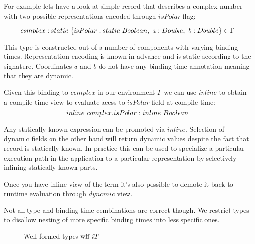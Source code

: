 For example lets have a look at simple record that describes a complex number with
two possible representations encoded through $isPolar$ flag:

\begin{equation}\nonumber
    complex: static\ \{ isPolar: static\ Boolean,\ a: Double,\ b: Double \} \in \Gamma
\end{equation}

This type is constructed out of a number of components with varying binding times.
Representation encoding is known in advance and is static according to the signature.
Coordinates $a$ and $b$ do not have any binding-time annotation meaning that they are
dynamic.

Given this binding to $complex$ in our environment $\Gamma$ we can use $inline$ to obtain
a compile-time view to evaluate acess to $isPolar$ field at compile-time:
\begin{equation}\nonumber
  inline\ complex.isPolar: inline\ Boolean
\end{equation}

Any statically known expression can be promoted via $inline$. Selection of dynamic fields
on the other hand will return dynamic values despite the fact that record is statically known.
In practice this can be used to specialize a particular execution path in the application to
a particular representation by selectively inlining statically known parts.

Once you have inline view of the term it's also possible to demote it back to runtime evaluation
through $dynamic$ view.

Not all type and binding time combinations are correct though. We restrict types
to disallow nesting of more specific binding times into less specific ones.

\begin{figure}[H]

  {}

  {}

  {}
\caption {Well formed types $\text{wff}\ i T$}
\end{figure}

